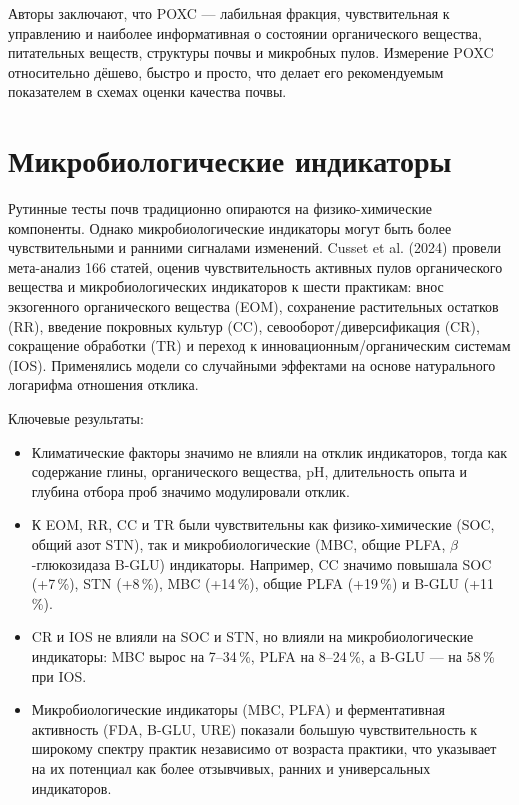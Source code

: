 \documentclass[11pt,a4paper]{article}
\begin{document}
Авторы заключают, что POXC --- лабильная фракция, чувствительная к управлению
и наиболее информативная о состоянии органического вещества, питательных
веществ, структуры почвы и микробных пулов. Измерение POXC относительно
дёшево, быстро и просто, что делает его рекомендуемым показателем в схемах
оценки качества почвы.

\section{Микробиологические индикаторы}
\label{sec:microbial}

Рутинные тесты почв традиционно опираются на физико-химические компоненты.
Однако микробиологические индикаторы могут быть более чувствительными и
ранними сигналами изменений. Cusset et al. (2024) провели мета-анализ
166 статей, оценив чувствительность активных пулов органического вещества и
микробиологических индикаторов к шести практикам: внос экзогенного
органического вещества (EOM), сохранение растительных остатков (RR), введение
покровных культур (CC), севооборот/диверсификация (CR), сокращение обработки
(TR) и переход к инновационным/органическим системам (IOS). Применялись модели
со случайными эффектами на основе натурального логарифма отношения отклика.

Ключевые результаты:
\begin{itemize}
  \item Климатические факторы значимо не влияли на отклик индикаторов, тогда
  как содержание глины, органического вещества, pH, длительность опыта и
  глубина отбора проб значимо модулировали отклик.
  \item К EOM, RR, CC и TR были чувствительны как физико-химические (SOC,
  общий азот STN), так и микробиологические (MBC, общие PLFA,
  $\beta$-глюкозидаза B-GLU) индикаторы. Например, CC значимо повышала SOC
  (+7\,\%), STN (+8\,\%), MBC (+14\,\%), общие PLFA (+19\,\%) и B-GLU
  (+11\,\%).
  \item CR и IOS не влияли на SOC и STN, но влияли на микробиологические
  индикаторы: MBC вырос на 7--34\,\%, PLFA на 8--24\,\%, а B-GLU --- на
  58\,\% при IOS.
  \item Микробиологические индикаторы (MBC, PLFA) и ферментативная активность
  (FDA, B-GLU, URE) показали большую чувствительность к широкому спектру
  практик независимо от возраста практики, что указывает на их потенциал как
  более отзывчивых, ранних и универсальных индикаторов.
\end{itemize}
\end{document}
